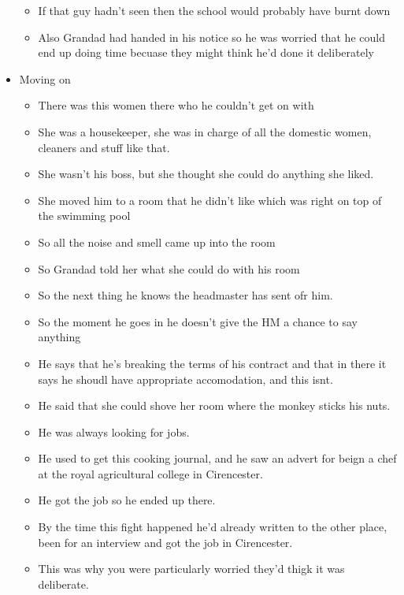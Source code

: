 \documentclass[10pt,twocolumn,letterpaper]{article}
\begin{document}
\begin{itemize}
\begin{itemize}
              \item If that guy hadn't seen then the school would probably have burnt down
              \item Also Grandad had handed in his notice so he was worried that he could end up doing time becuase they might think he'd done it deliberately
          \end{itemize}
    \item Moving on
          \begin{itemize}
              \item There was this women there who he couldn't get on with
              \item She was a housekeeper, she was in charge of all the domestic  women, cleaners and stuff like that.
              \item She wasn't his boss, but she thought she could do anything she liked.
              \item She moved him to a room that he didn't like which was right on top of the swimming pool
              \item So all the noise and smell came up into the room
              \item So Grandad told her what she could do with his room
              \item So the next thing he knows the headmaster has sent ofr him.
              \item So the moment he goes in he doesn't give the HM a chance to say anything
              \item He says that he's breaking the terms of his contract and that in there it says he shoudl have appropriate accomodation, and this isnt.
              \item He said that she could shove her room where the monkey sticks his nuts.
              \item He was always looking for jobs.
              \item He used to get this cooking journal, and he saw an advert for beign a chef at the royal agricultural college in Cirencester.
              \item He got the job so he ended up there.
              \item By the time this fight happened he'd already written to the other place, been for an interview and got the job in Cirencester.
              \item This was why you were particularly worried they'd thigk it was deliberate.
          \end{itemize}

\end{itemize}
\end{document}
